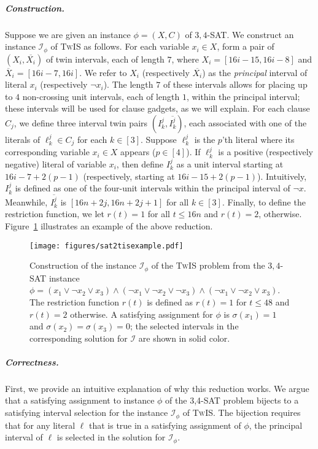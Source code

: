 \documentclass[letterpaper,11pt]{article}
\newcommand{\sssattt}{\textsc{$3,4$-SAT}\xspace}
\newcommand{\tis}{\textsc{TwIS}\xspace}
\begin{document}
\subparagraph*{Construction.} 
Suppose we are given an instance $\phi=(X, C)$ of \sssattt. We construct an instance $\mathcal{I}_\phi$ of \tis as follows. 
For each variable $x_i \in X$, 
form a pair of $(X_i,\overline{X_i})$ of twin intervals, each of length $7$, where $X_i = [16i - 15, 16i - 8]$ and 
$\overline{X}_i = [16i - 7, 16i]$. 
We refer to $X_i$ (respectively $\overline{X_i}$) as the \emph{principal} interval of literal $x_i$ (respectively $\neg x_i$). 
The length $7$ of these intervals allows for placing up to $4$ non-crossing unit intervals, each of length $1$, within the principal interval; these intervals will be used for clause gadgets, as we will explain.
For each clause $C_j$, we define three interval twin pairs $(I_k^j,\overline{I_k^j})$, each associated with one of the literals of $\ell^j_k\in C_j$ for each $k\in[3]$. Suppose $\ell^j_k$ is the $p$'th literal where its corresponding variable $x_i\in X$ appears ($p\in[4]$). If $\ell^j_k$ is a positive (respectively negative) literal of variable $x_i$, 
 then define $I_k^j$ as a unit interval starting at $16i-7+2(p-1)$ 
 (respectively, starting at $16i-15+2(p-1)$).
Intuitively, $I_k^j$ is defined as one of the four-unit intervals within the principal interval of $\neg x$.
Meanwhile, $\overline{I_k^j}$ is $[16n+2j, 16n+2j+1]$ for all $k \in [3]$. 
Finally, to define the restriction function, we let $r(t)=1$ for all $t\leq 16n$ and $r(t)=2$, otherwise. Figure~\ref{fig:SAT2TIS-example} illustrates an example of the above reduction. 

\begin{figure}
	\centering
	\texttt{[image: figures/sat2tisexample.pdf]}
	\caption{Construction of the instance $\mathcal{I}_\phi$ of the \tis problem 
    from the \sssattt instance $\phi = (x_1 \lor \neg{x_2} \lor x_3) \land (\neg{x_1} \lor \neg{x_2} \lor \neg{x_3}) \land (\neg{x_1} \lor \neg{x_2} \lor x_3) $. The restriction function $r(t)$ is defined as $r(t) = 1$ for $t \leq 48$ and $r(t) = 2$ otherwise. A satisfying assignment for $\phi$ is $\sigma(x_1)=1$ and $\sigma(x_2) = \sigma(x_3)=0$; the selected intervals in the corresponding solution for $\mathcal{I}$ are shown in solid color.}
    \label{fig:SAT2TIS-example}
\end{figure}

\subparagraph*{Correctness.}
First, we provide an intuitive explanation of why this reduction works. We argue that a satisfying assignment to instance $\phi$ of the 3,4-SAT problem bijects to a satisfying interval selection for the instance $\mathcal{I}_\phi$ of \tis. The bijection requires that for any literal $\ell$ that is true in a satisfying assignment of $\phi$, the principal interval of $\ell$ is selected in the solution for $\mathcal{I}_\phi$. 
\end{document}
